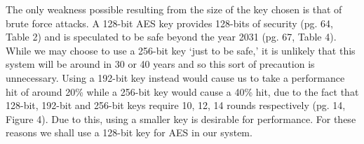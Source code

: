 \documentclass[12pt, titlepage]{article}
\begin{document}
The only weakness possible resulting from the size of the key chosen is that of brute force attacks. A 128-bit AES key provides 128-bits of security (pg. 64, Table 2) and is speculated to be safe beyond the year 2031 (pg. 67, Table 4).\cite{nistKeys}
While we may choose to use a 256-bit key `just to be safe,' it is unlikely that this system will be around in 30 or 40 years and so this sort of precaution is unnecessary. Using a 192-bit key instead would cause us to take a performance hit of around 20\% while a 256-bit key would cause a 40\% hit, due to the fact that 128-bit, 192-bit and 256-bit keys require 10, 12, 14 rounds respectively (pg. 14, Figure 4).\cite{announcingAES} Due to this, using a smaller key is desirable for performance.
\newline For these reasons we shall use a 128-bit key for AES in our system.
\end{document}
